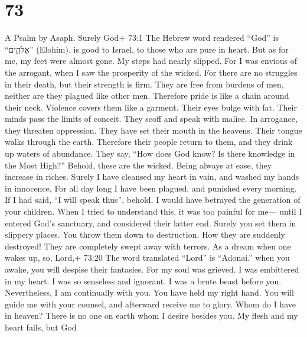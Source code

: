 \hypertarget{section-70}{%
\section{73}\label{section-70}}

A Psalm by Asaph.  Surely God+ 73:1 The Hebrew word rendered
``God'' is ``אֱלֹהִ֑ים'' (Elohim). is good to Israel, to those who are
pure in heart.  But as for me, my feet were almost gone. My
steps had nearly slipped.  For I was envious of the
arrogant, when I saw the prosperity of the wicked.  For
there are no struggles in their death, but their strength is firm.
 They are free from burdens of men, neither are they plagued
like other men.  Therefore pride is like a chain around
their neck. Violence covers them like a garment.  Their eyes
bulge with fat. Their minds pass the limits of conceit. 
They scoff and speak with malice. In arrogance, they threaten
oppression.  They have set their mouth in the heavens. Their
tongue walks through the earth.  Therefore their people
return to them, and they drink up waters of abundance. 
They say, ``How does God know? Is there knowledge in the Most High?''
 Behold, these are the wicked. Being always at ease, they
increase in riches.  Surely I have cleansed my heart in
vain, and washed my hands in innocence,  For all day long I
have been plagued, and punished every morning.  If I had
said, ``I will speak thus'', behold, I would have betrayed the
generation of your children.  When I tried to understand
this, it was too painful for me---  until I entered God's
sanctuary, and considered their latter end.  Surely you set
them in slippery places. You throw them down to destruction.
 How they are suddenly destroyed! They are completely swept
away with terrors.  As a dream when one wakes up, so,
Lord,+ 73:20 The word translated ``Lord'' is ``Adonai.'' when you awake,
you will despise their fantasies.  For my soul was grieved.
I was embittered in my heart.  I was so senseless and
ignorant. I was a brute beast before you.  Nevertheless, I
am continually with you. You have held my right hand.  You
will guide me with your counsel, and afterward receive me to glory.
 Whom do I have in heaven? There is no one on earth whom I
desire besides you.  My flesh and my heart fails, but God
